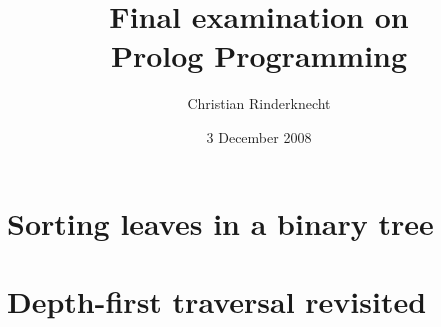 \documentclass[11pt,a4paper]{article}
\title{Final examination on\\ Prolog Programming}
\author{Christian Rinderknecht}
\date{3 December 2008}
\begin{document}
\maketitle
\thispagestyle{empty}

\section{Sorting leaves in a binary tree}



\section{Depth-first traversal revisited}


\end{document}
